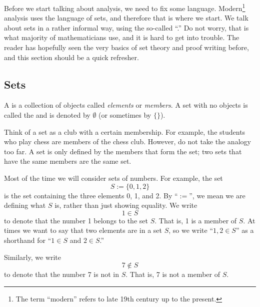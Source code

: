 
Before we start talking about analysis, we need to fix some language.
Modern\footnote{The term ``modern'' refers to late 19th century up to
the present.}
analysis uses the language of sets, and therefore that is where we start.
We talk about sets in a rather informal way, using the so-called
``.''  Do not worry, that is what majority of
mathematicians use, and it is hard to get into trouble.
The reader has hopefully seen the very basics of set theory
and proof writing before, and this section should be a quick refresher.

\subsection{Sets}

\begin{defn}
A \emph{} is a collection of objects called
\emph{elements} or \emph{members}.  A set with
no objects is called the \emph{} and is denoted by
$\emptyset$ (or sometimes by $\{ \}$).
\end{defn}

Think of a set as a club with a certain membership.  For
example, the students who play chess are members of the chess club.  However,
do not take the analogy too far.  A set is only defined by the members
that form the set; two sets that have the same members are the same set.

Most of the time we will consider sets
of numbers.  For example, the set
\begin{equation*}
S := \{ 0, 1, 2 \}
\end{equation*}
is the set containing
the three elements 0, 1, and 2.
By ``$:=$'', we mean we are defining what $S$ is, rather than
just showing equality.
We write
\begin{equation*}
1 \in S
\end{equation*}
to denote that the number 1 belongs to the set $S$.  That is, 1 is a member
of $S$.
At times we want to say that two elements are in a set $S$, so we 
write ``$1,2 \in S$'' as a shorthand for ``$1 \in S$ and $2 \in S$.''

Similarly, we write
\begin{equation*}
7 \notin S
\end{equation*}
to denote that the number 7 is not in $S$.  That is, 7 is not a member of
$S$.

